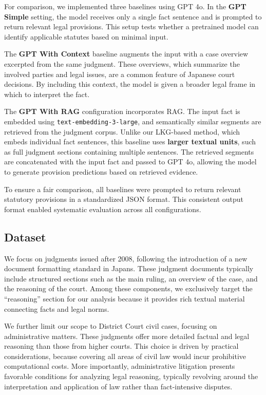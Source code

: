 \documentclass[11pt]{article}
\begin{document}
For comparison, we implemented three baselines using GPT 4o. In the \textbf{GPT Simple} setting, the model receives only a single fact sentence and is prompted to return relevant legal provisions. This setup tests whether a pretrained model can identify applicable statutes based on minimal input.

The \textbf{GPT With Context} baseline augments the input with a case overview excerpted from the same judgment. These overviews, which summarize the involved parties and legal issues, are a common feature of Japanese court decisions. By including this context, the model is given a broader legal frame in which to interpret the fact.

The \textbf{GPT With RAG} configuration incorporates RAG. The input fact is embedded using \texttt{text-embedding-3-large}, and semantically similar segments are retrieved from the judgment corpus. Unlike our LKG-based method, which embeds individual fact sentences, this baseline uses \textbf{larger textual units}, such as full judgment sections containing multiple sentences. The retrieved segments are concatenated with the input fact and passed to GPT 4o, allowing the model to generate provision predictions based on retrieved evidence.

To ensure a fair comparison, all baselines were prompted to return relevant statutory provisions in a standardized JSON format. This consistent output format enabled systematic evaluation across all configurations.



\subsection{Dataset}



We focus on judgments issued after 2008, following the introduction of a new document formatting standard in Japans. These judgment documents typically include structured sections such as the main ruling, an overview of the case, and the reasoning of the court. Among these components, we exclusively target the ``reasoning'' section for our analysis because it provides rich textual material connecting facts and legal norms. 




We further limit our scope to District Court civil cases, focusing on administrative matters. These judgments offer more detailed factual and legal reasoning than those from higher courts. This choice is driven by practical considerations, because covering all areas of civil law would incur prohibitive computational costs. More importantly, administrative litigation presents favorable conditions for analyzing legal reasoning, typically revolving around the interpretation and application of law rather than fact-intensive disputes.
\end{document}
